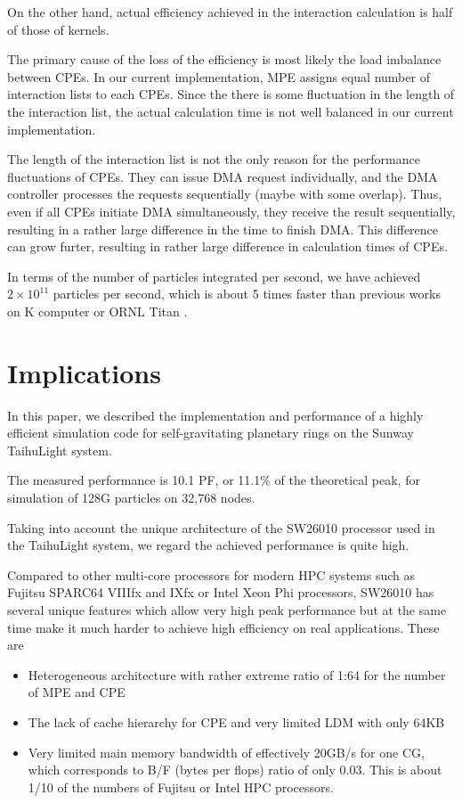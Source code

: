 \documentclass[sigconf]{acmart}
\begin{document}
On the other hand, actual efficiency achieved  in the interaction calculation
is half of those of kernels.


The primary cause of the loss of the efficiency is most likely the
load imbalance between CPEs. In our current implementation, MPE 
assigns equal number of interaction lists to each CPEs. Since the
there is some fluctuation in the length of the interaction list, the
actual calculation time is not well balanced in our current
implementation.

The length of the interaction list is not the only reason for the
performance fluctuations of CPEs. They can issue DMA request
individually, and the DMA controller processes the requests
sequentially (maybe with some overlap). Thus, even if all CPEs
initiate DMA simultaneously, they receive the result sequentially,
resulting in a rather large difference in the time to finish DMA. This
difference can grow furter, resulting in rather large difference in 
calculation times of CPEs. 

 In terms of the number of
particles integrated per second, we have achieved $2\times
10^{11}$ particles per second, which is about 5 times faster than previous works on
K computer\cite{Ishiyamaetal2012} or ORNL Titan
\cite{Bedorfetal2014}.
\section{Implications}


In this paper, we described the implementation and performance of
a highly efficient simulation code for self-gravitating planetary
rings on the Sunway TaihuLight system.

The measured performance is 10.1 PF, or 11.1\% of the theoretical peak,
for simulation of 128G particles on 32,768 nodes.

Taking into account the unique architecture of the SW26010 processor
used in the TaihuLight system, we regard the achieved performance is
quite high. 

Compared to other multi-core processors for modern  HPC systems such
as Fujitsu SPARC64 VIIIfx and IXfx or Intel Xeon Phi processors,
SW26010 has several unique features which allow very high peak
performance but at the same time make it much harder to achieve high
efficiency on real applications. These are

\begin{itemize}

  \item Heterogeneous architecture with rather extreme ratio of 1:64
    for the number of MPE and CPE
  \item The lack of cache hierarchy for CPE and very limited LDM with
    only 64KB
  \item Very limited main memory bandwidth of effectively 20GB/s for
    one CG, which corresponds to B/F (bytes per flops) ratio of only
    0.03. This is about 1/10 of the numbers of Fujitsu or Intel HPC processors.
    
\end{itemize}  
\end{document}
